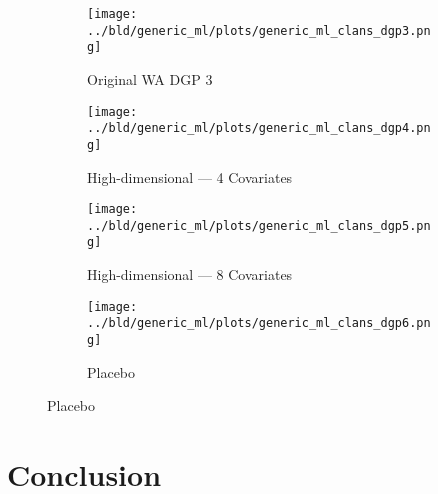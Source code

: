 \documentclass[11pt, a4paper, leqno]{article}
\begin{document}
\begin{figure}
    \caption{Simulation Results: Generic ML --- CLANS}\label{fig:clans}

    \centering
     \begin{subfigure}[b]{0.475\textwidth}
         \centering
         \texttt{[image: ../bld/generic\_ml/plots/generic\_ml\_clans\_dgp3.png]}
         \caption{Original WA DGP 3}\label{fig_clans:dgp3}
     \end{subfigure}
     \hfill
     \begin{subfigure}[b]{0.475\textwidth}
         \centering
         \texttt{[image: ../bld/generic\_ml/plots/generic\_ml\_clans\_dgp4.png]}
         \caption{High-dimensional --- 4 Covariates}\label{fig_clans:dgp4}
     \end{subfigure}

     \begin{subfigure}[b]{0.475\textwidth}
         \centering
         \texttt{[image: ../bld/generic\_ml/plots/generic\_ml\_clans\_dgp5.png]}
         \caption{High-dimensional --- 8 Covariates}\label{fig_clans:dgp5}
     \end{subfigure}
     \begin{subfigure}[b]{0.475\textwidth}
         \centering
         \texttt{[image: ../bld/generic\_ml/plots/generic\_ml\_clans\_dgp6.png]}
         \caption{Placebo}\label{fig_clans:dgp6}
     \end{subfigure}

\end{figure}

\section{Conclusion}

\clearpage
\newpage

\printbibliography
{}


\end{document}
